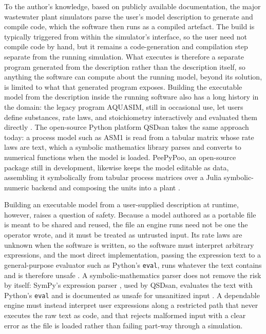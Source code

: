 \documentclass{article}
\begin{document}
To the author's knowledge, based on publicly available documentation, the major wastewater plant simulators parse the user's model description to generate and compile code, which the software then runs as a compiled artefact. The build is typically triggered from within the simulator's interface, so the user need not compile code by hand, but it remains a code-generation and compilation step separate from the running simulation. What executes is therefore a separate program generated from the description rather than the description itself, so anything the software can compute about the running model, beyond its solution, is limited to what that generated program exposes. Building the executable model from the description inside the running software also has a long history in the domain: the legacy program AQUASIM, still in occasional use, let users define substances, rate laws, and stoichiometry interactively and evaluated them directly \citep{reichert1994}. The open-source Python platform QSDsan \citep{qsdsan} takes the same approach today: a process model such as ASM1 is read from a tabular matrix whose rate laws are text, which a symbolic mathematics library parses and converts to numerical functions when the model is loaded. PeePyPoo, an open-source package still in development, likewise keeps the model editable as data, assembling it symbolically from tabular process matrices over a Julia symbolic-numeric backend and composing the units into a plant \citep{peepypoo}.

Building an executable model from a user-supplied description at runtime, however, raises a question of safety. Because a model authored as a portable file is meant to be shared and reused, the file an engine runs need not be one the operator wrote, and it must be treated as untrusted input. Its rate laws are unknown when the software is written, so the software must interpret arbitrary expressions, and the most direct implementation, passing the expression text to a general-purpose evaluator such as Python's \texttt{eval}, runs whatever the text contains and is therefore unsafe \citep{richards2011eval, cwe94}. A symbolic-mathematics parser does not remove the risk by itself: SymPy's expression parser \citep{meurer2017}, used by QSDsan, evaluates the text with Python's \texttt{eval} and is documented as unsafe for unsanitized input \citep{sympyparsing}. A dependable engine must instead interpret user expressions along a restricted path that never executes the raw text as code, and that rejects malformed input with a clear error as the file is loaded rather than failing part-way through a simulation.
\end{document}

